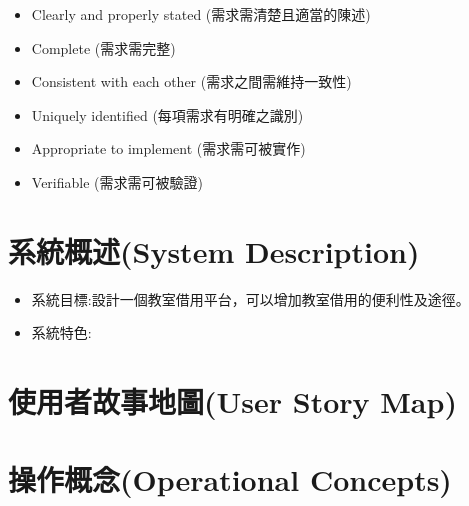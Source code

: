 \documentclass{article}
\begin{document}
\begin{itemize}
	\color{blue}
	\item Clearly and properly stated (需求需清楚且適當的陳述)
	\item Complete (需求需完整)
	\item Consistent with each other (需求之間需維持一致性)
	\item Uniquely identified (每項需求有明確之識別)
	\item Appropriate to implement (需求需可被實作)
	\item Verifiable (需求需可被驗證)
\end{itemize}

\newpage

\section[系統概述(SYSTEM DESCRIPTION)]{系統概述(System Description)}

\begin{itemize}
	\item 系統目標:設計一個教室借用平台，可以增加教室借用的便利性及途徑。
	\item 系統特色:
\end{itemize}

\newpage

\section[使用者故事地圖(USER STORY MAP)]{使用者故事地圖(User Story Map)}

\newpage

\section[操作概念(OPERATIONAL CONCEPTS)]{操作概念(Operational Concepts)}

\newpage
\end{document}
